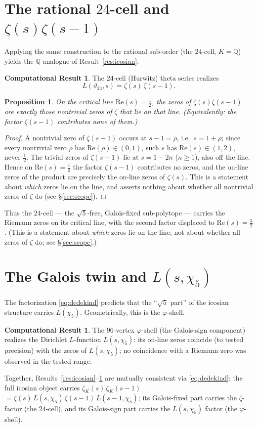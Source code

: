 \documentclass[11pt]{article}
\newtheorem{proposition}[theorem]{Proposition}
\theoremstyle{definition}
\newtheorem{verified}[theorem]{Computational Result}
\newcommand{\Q}{\mathbb{Q}}
\newcommand{\zetaK}{\zeta_{K}}
\renewcommand{\Theta}{\vartheta}
\begin{document}
\section{The rational \texorpdfstring{$24$}{24}-cell and \texorpdfstring{$\zeta(s)\zeta(s-1)$}{zeta(s)zeta(s-1)}}\label{sec:24cell}
Applying the same construction to the rational sub-order (the $24$-cell, $K=\Q$)
yields the $\Q$-analogue of Result~\ref{res:icosian}.
\begin{verified}\label{res:24cell}
The $24$-cell (Hurwitz) theta series realizes
\[
   L(\Theta_{24},s)=\zeta(s)\,\zeta(s-1).
\]
\end{verified}
\begin{proposition}\label{prop:online}
On the critical line $\mathrm{Re}(s)=\tfrac12$, the zeros of $\zeta(s)\zeta(s-1)$ are
exactly those nontrivial zeros of $\zeta$ that lie on that line. (Equivalently: the
factor $\zeta(s-1)$ contributes none of them.)
\end{proposition}
\begin{proof}
A nontrivial zero of $\zeta(s-1)$ occurs at $s-1=\rho$, i.e.\ $s=1+\rho$; since every
nontrivial zero $\rho$ has $\mathrm{Re}(\rho)\in(0,1)$, such $s$ has
$\mathrm{Re}(s)\in(1,2)$, never $\tfrac12$. The trivial zeros of $\zeta(s-1)$ lie at
$s=1-2n$ ($n\ge1$), also off the line. Hence on $\mathrm{Re}(s)=\tfrac12$ the factor
$\zeta(s-1)$ contributes no zeros, and the on-line zeros of the product are precisely
the on-line zeros of $\zeta(s)$. This is a statement about \emph{which} zeros lie on the
line, and asserts nothing about whether all nontrivial zeros of $\zeta$ do
(see \S\ref{sec:scope}).
\end{proof}
Thus the $24$-cell --- the $\sqrt5$-free, Galois-fixed sub-polytope --- carries the
Riemann zeros on its critical line, with the second factor displaced to
$\mathrm{Re}(s)=\tfrac32$. (This is a statement about \emph{which} zeros lie on the
line, not about whether all zeros of $\zeta$ do; see \S\ref{sec:scope}.)

\section{The Galois twin and \texorpdfstring{$L(s,\chi_5)$}{L(s,chi5)}}\label{sec:twin}
The factorization \eqref{eq:dedekind} predicts that the ``$\sqrt5$ part'' of the
icosian structure carries $L(\chi_5)$. Geometrically, this is the $\varphi$-shell.
\begin{verified}\label{res:twin}
The $96$-vertex $\varphi$-shell (the Galois-sign component) realizes the Dirichlet
$L$-function $L(s,\chi_5)$: its on-line zeros coincide (to tested precision) with the
zeros of $L(s,\chi_5)$; no coincidence with a Riemann zero was observed in the tested
range.
\end{verified}
Together, Results~\ref{res:icosian}--\ref{res:twin} are mutually consistent via
\eqref{eq:dedekind}: the full icosian object carries $\zetaK(s)\,\zetaK(s-1)$
$=\zeta(s)\,L(s,\chi_5)\,\zeta(s-1)\,L(s-1,\chi_5)$; its Galois-fixed part carries the
$\zeta$-factor (the $24$-cell), and its Galois-sign part carries the $L(s,\chi_5)$
factor (the $\varphi$-shell).
\end{document}
